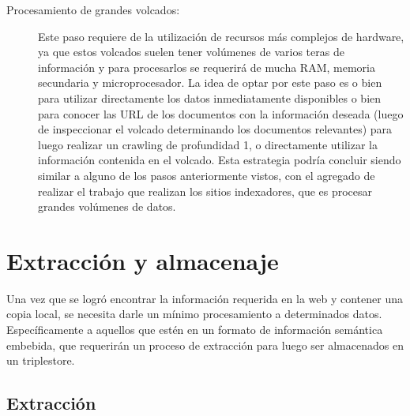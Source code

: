 \begin{description}
\item[Procesamiento de grandes volcados:] Este paso requiere de la utilización de recursos más complejos de hardware, ya que estos volcados suelen tener volúmenes de varios teras de información y para procesarlos se requerirá 
de mucha RAM, memoria secundaria y microprocesador.
La idea de optar por este paso es o bien para utilizar directamente los datos inmediatamente disponibles o bien para conocer las URL de los documentos con la información deseada (luego de inspeccionar el volcado determinando los documentos relevantes) para luego realizar un crawling de profundidad 1, 
o directamente utilizar la información contenida en el volcado.
Esta estrategia podría concluir siendo similar a alguno de los pasos anteriormente vistos, con el agregado de realizar el trabajo que realizan los sitios indexadores, que es procesar grandes volúmenes de datos.
\end{description}

\section{Extracción y almacenaje}
\label{section:extraccion}
Una vez que se logró encontrar la información requerida en la web y contener una copia local, se necesita darle un mínimo procesamiento a determinados datos.
Específicamente a aquellos que estén en un formato de información semántica embebida, que requerirán un proceso de extracción para luego ser almacenados en un triplestore.


\subsection{Extracción}


